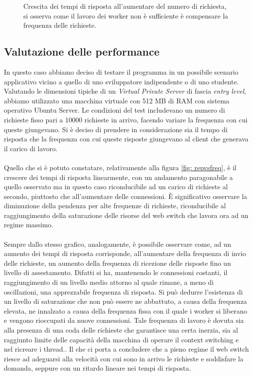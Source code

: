 \documentclass[italian]{tktltiki2}
\begin{document}
\begin{figure}[H]
\caption{Crescita dei tempi di risposta all'aumentare del numero di richiesta, si osserva come il lavoro dei worker non è sufficiente è compensare la frequenza delle richieste. \label{fig: cfr_reply_time2}}
\end{figure}
\subsection{Valutazione delle performance}
In questo caso abbiamo deciso di testare il programma in un possibile scenario applicativo vicino a quello di uno sviluppatore indipendente o di uno studente. Valutando le dimensioni tipiche di un \emph{Virtual Private Server} di fascia \emph{entry level}, abbiamo utilizzato una macchina virtuale con 512 MB di RAM con sistema operativo Ubuntu Server. Le condizioni del test includevano un numero di richieste fisso pari a 10000 richieste in arrivo, facendo variare la frequenza con cui queste giungevano. Si è deciso di prendere in considerazione sia il tempo di risposta che la frequenza con cui queste risposte giungevano al client che generava il carico di lavoro. \\\\ 
Quello che si è potuto constatare, relativamente alla figura \ref{fig: repvsfreq}, è il crescere dei tempi di risposta linearmente, con un andamento paragonabile a quello osservato ma in questo caso riconducibile ad un carico di richieste al secondo, piuttosto che all'aumentare delle connessioni. È significativo osservare la diminuzione della pendenza per alte frequenze di richieste, riconducibile al raggiungimento della saturazione delle risorse del web switch che lavora ora ad un regime massimo.\\\\
Sempre dallo stesso grafico, analogamente, è possibile osservare come, ad un aumento dei tempi di risposta corrisponde, all'aumentare della frequenza di invio delle richieste, un aumento della frequenza di ricezione delle risposte fino un livello di assestamento. Difatti si ha, mantenendo le connessioni costanti, il raggiungimento di un livello medio attorno al quale rimane, a meno di oscillazioni, una apprezzabile frequenza di risposta. Si può dedurre l'esistenza di un livello di saturazione che non può essere ne abbattuto, a causa della frequenza elevata, ne innalzato a causa della frequenza fissa con il quale i worker si liberano e vengono rioccupati da nuove connessioni. Tale frequenza di lavoro è dovuta sia alla presenza di una coda delle richieste che garantisce una certa inerzia, sia al raggiunto limite delle capacità della macchina di operare il context switching e nel ricreare i thread.. Il che ci porta a concludere che a pieno regime il web switch riesce ad adeguarsi alla velocità con cui sono in arrivo le richieste e soddisfare la domanda, seppure con un ritardo lineare nei tempi di risposta.
\end{document}
